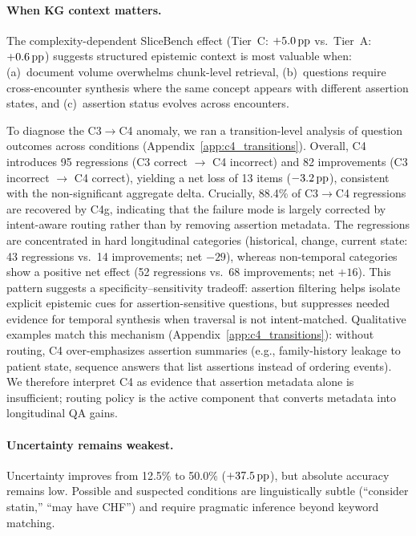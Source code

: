 \paragraph{When KG context matters.}
The complexity-dependent SliceBench effect (Tier~C: $+5.0\,\text{pp}$ vs.\ Tier~A: $+0.6\,\text{pp}$) suggests structured epistemic context is most valuable when: (a)~document volume overwhelms chunk-level retrieval, (b)~questions require cross-encounter synthesis where the same concept appears with different assertion states, and (c)~assertion status evolves across encounters.

To diagnose the C3$\to$C4 anomaly, we ran a transition-level analysis of question outcomes across conditions (Appendix~\ref{app:c4_transitions}).
Overall, C4 introduces 95 regressions (C3 correct $\to$ C4 incorrect) and 82 improvements (C3 incorrect $\to$ C4 correct), yielding a net loss of 13 items ($-3.2\,\text{pp}$), consistent with the non-significant aggregate delta.
Crucially, 88.4\% of C3$\to$C4 regressions are recovered by C4g, indicating that the failure mode is largely corrected by intent-aware routing rather than by removing assertion metadata.
The regressions are concentrated in hard longitudinal categories (historical, change, current state: 43 regressions vs.\ 14 improvements; net $-29$), whereas non-temporal categories show a positive net effect (52 regressions vs.\ 68 improvements; net $+16$).
This pattern suggests a specificity--sensitivity tradeoff: assertion filtering helps isolate explicit epistemic cues for assertion-sensitive questions, but suppresses needed evidence for temporal synthesis when traversal is not intent-matched.
Qualitative examples match this mechanism (Appendix~\ref{app:c4_transitions}): without routing, C4 over-emphasizes assertion summaries (e.g., family-history leakage to patient state, sequence answers that list assertions instead of ordering events).
We therefore interpret C4 as evidence that assertion metadata alone is insufficient; routing policy is the active component that converts metadata into longitudinal QA gains.

\paragraph{Uncertainty remains weakest.}
Uncertainty improves from 12.5\% to 50.0\% ($+37.5\,\text{pp}$), but absolute accuracy remains low.
Possible and suspected conditions are linguistically subtle (``consider statin,'' ``may have CHF'') and require pragmatic inference beyond keyword matching.

